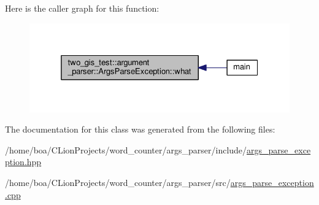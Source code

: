 Here is the caller graph for this function\+:\nopagebreak
\begin{figure}[H]
\begin{center}
\leavevmode
\includegraphics[width=325pt]{classtwo__gis__test_1_1argument__parser_1_1_args_parse_exception_a46924e2f070476eaf5091c2d19bdc57c_icgraph}
\end{center}
\end{figure}




The documentation for this class was generated from the following files\+:\begin{DoxyCompactItemize}
\item 
/home/boa/\+C\+Lion\+Projects/word\+\_\+counter/args\+\_\+parser/include/\hyperlink{args__parse__exception_8hpp}{args\+\_\+parse\+\_\+exception.\+hpp}\item 
/home/boa/\+C\+Lion\+Projects/word\+\_\+counter/args\+\_\+parser/src/\hyperlink{args__parse__exception_8cpp}{args\+\_\+parse\+\_\+exception.\+cpp}\end{DoxyCompactItemize}
